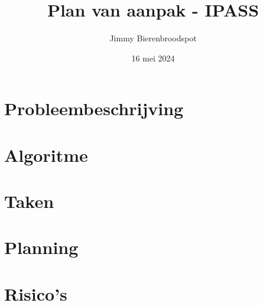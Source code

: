 \documentclass{article}
\title{Plan van aanpak - IPASS}
\author{Jimmy Bierenbroodspot}
\date{16 mei 2024}
\begin{document}
\begin{titlepage}
    \maketitle
\end{titlepage}

\tableofcontents

\newpage

\section{Probleembeschrijving}

\section{Algoritme}

\section{Taken}

\section{Planning}

\section{Risico's}
\end{document}
